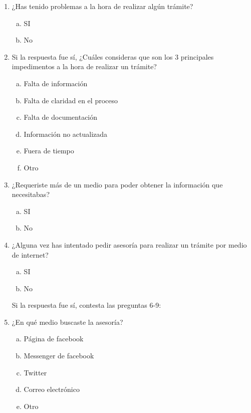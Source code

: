 \begin{multicols}{2}
\begin{enumerate}
                    \item ¿Has tenido problemas a la hora de realizar algún trámite?
                    \begin{enumerate}[(a)]
                        \item SI
                        \item No
                    \end{enumerate}
                    \item Si la respuesta fue sí, ¿Cuáles consideras que son los 3 principales impedimentos a la hora de realizar un trámite?
                    \begin{enumerate}[(a)]
                        \item Falta de información
                        \item Falta de claridad en el proceso
                        \item Falta de documentación
                        \item Información no actualizada 
                        \item Fuera de tiempo
                        \item Otro
                    \end{enumerate}
                    \item ¿Requeriste más de un medio para poder obtener la información que necesitabas?
                    \begin{enumerate}[(a)]
                        \item SI
                        \item No
                    \end{enumerate}
                    \item ¿Alguna vez has intentado pedir asesoría para realizar un trámite por medio de internet?
                    \begin{enumerate}[(a)]
                        \item SI
                        \item No
                    \end{enumerate}
                    Si la respuesta fue sí, contesta las preguntas 6-9: 
                    \item ¿En qué medio buscaste la asesoría?
                    \begin{enumerate}[(a)]
                        \item Página de facebook
                        \item Messenger de facebook
                        \item Twitter
                        \item Correo electrónico
                        \item Otro
                    \end{enumerate}
                

\end{enumerate}
\end{multicols}
